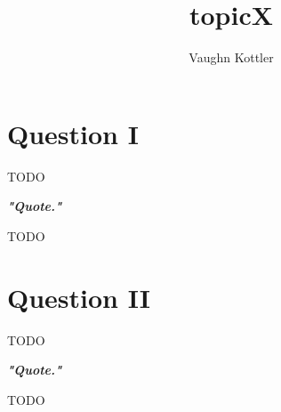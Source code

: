 \documentclass[letterpaper,11pt]{article}
\title{topicX}
\author{Vaughn Kottler}
\begin{document}
\section*{\break Question I}

TODO

\begin{flushleft}
\textit{\textbf{"Quote."}}
\end{flushleft}

\noindent
TODO

\section*{Question II}

TODO

\begin{flushleft}
\textit{\textbf{"Quote."}}
\end{flushleft}

\noindent
TODO
\end{document}
